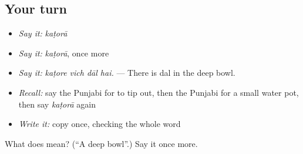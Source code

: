 \subsection*{Your turn}
\begin{itemize}
\raggedright
  \item \emph{Say it:} \emph{kaṭorā}
  \item \emph{Say it:} \emph{kaṭorā}, once more
  \item \emph{Say it:} \emph{kaṭore vich dāl hai.} — There is dal in the deep bowl.
  \item \emph{Recall:} say the Punjabi for to tip out, then the Punjabi for a small water pot, then say \emph{kaṭorā} again
  \item \emph{Write it:} copy \textbf{} once, checking the whole word
\end{itemize}

\begin{tcolorbox}[breakable,colback=teal!4,colframe=teal!35!black,title={Before you move on}]
What does  mean? (\textquotedblleft{}A deep bowl\textquotedblright{}.) Say it once more.
\end{tcolorbox}
